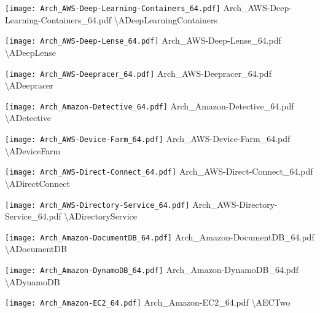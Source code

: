  {\texttt{[image: Arch\_AWS-Deep-Learning-Containers\_64.pdf]}} {Arch\_AWS-Deep-Learning-Containers\_64.pdf} {{\textbackslash}ADeepLearningContainers}

 {\texttt{[image: Arch\_AWS-Deep-Lense\_64.pdf]}} {Arch\_AWS-Deep-Lense\_64.pdf} {{\textbackslash}ADeepLense}

 {\texttt{[image: Arch\_AWS-Deepracer\_64.pdf]}} {Arch\_AWS-Deepracer\_64.pdf} {{\textbackslash}ADeepracer}

 {\texttt{[image: Arch\_Amazon-Detective\_64.pdf]}} {Arch\_Amazon-Detective\_64.pdf} {{\textbackslash}ADetective}

 {\texttt{[image: Arch\_AWS-Device-Farm\_64.pdf]}} {Arch\_AWS-Device-Farm\_64.pdf} {{\textbackslash}ADeviceFarm}

 {\texttt{[image: Arch\_AWS-Direct-Connect\_64.pdf]}} {Arch\_AWS-Direct-Connect\_64.pdf} {{\textbackslash}ADirectConnect}

 {\texttt{[image: Arch\_AWS-Directory-Service\_64.pdf]}} {Arch\_AWS-Directory-Service\_64.pdf} {{\textbackslash}ADirectoryService}

 {\texttt{[image: Arch\_Amazon-DocumentDB\_64.pdf]}} {Arch\_Amazon-DocumentDB\_64.pdf} {{\textbackslash}ADocumentDB}

 {\texttt{[image: Arch\_Amazon-DynamoDB\_64.pdf]}} {Arch\_Amazon-DynamoDB\_64.pdf} {{\textbackslash}ADynamoDB}

 {\texttt{[image: Arch\_Amazon-EC2\_64.pdf]}} {Arch\_Amazon-EC2\_64.pdf} {{\textbackslash}AECTwo}

